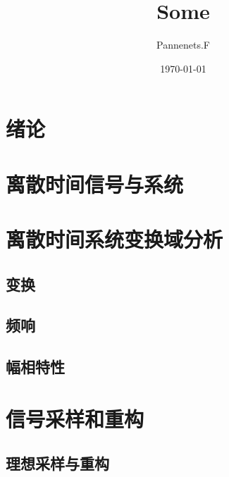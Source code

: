 \documentclass[en,11pt,english,black,simple,device=ppt]{elegantbook}
\title{Some}
\author{Pannenets.F}
\date{\today}
\begin{document}
\maketitle
\frontmatter


\mainmatter

\chapter{绪论}



\chapter{离散时间信号与系统}



\chapter{离散时间系统变换域分析}

\section{变换}



\section{频响}



\section{幅相特性}



\chapter{信号采样和重构}

\section{理想采样与重构}



\end{document}
